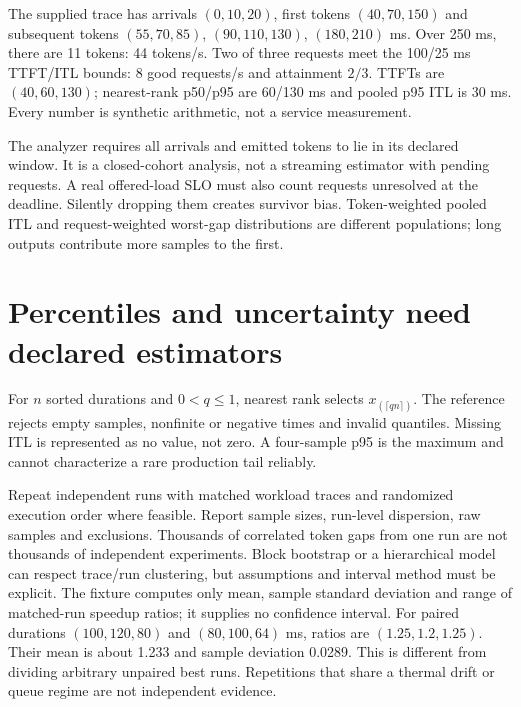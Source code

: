 The supplied trace has arrivals $(0,10,20)$, first tokens $(40,70,150)$ and
subsequent tokens $(55,70,85)$, $(90,110,130)$, $(180,210)$ ms. Over 250 ms,
there are 11 tokens: 44 tokens/s. Two of three requests meet the 100/25 ms
TTFT/ITL bounds: 8 good requests/s and attainment $2/3$. TTFTs are $(40,60,130)$;
nearest-rank p50/p95 are 60/130 ms and pooled p95 ITL is 30 ms. Every number
is synthetic arithmetic, not a service measurement.

The analyzer requires all arrivals and emitted tokens to lie in its declared
window. It is a closed-cohort analysis, not a streaming estimator with pending
requests. A real offered-load SLO must also count requests unresolved at the
deadline. Silently dropping them creates survivor bias. Token-weighted pooled
ITL and request-weighted worst-gap distributions are different populations;
long outputs contribute more samples to the first.

\section{Percentiles and uncertainty need declared estimators}
\label{evod47:uncertainty}
For $n$ sorted durations and $0<q\le1$, nearest rank selects
$x_{(\lceil qn\rceil)}$. The reference rejects empty samples, nonfinite or
negative times and invalid quantiles. Missing ITL is represented as no value,
not zero. A four-sample p95 is the maximum and cannot characterize a rare
production tail reliably.

Repeat independent runs with matched workload traces and randomized execution
order where feasible. Report sample sizes, run-level dispersion, raw samples
and exclusions. Thousands of correlated token gaps from one run are not
thousands of independent experiments. Block bootstrap or a hierarchical
model can respect trace/run clustering, but assumptions and interval method
must be explicit. The fixture computes only mean, sample standard deviation
and range of matched-run speedup ratios; it supplies no confidence interval.
For paired durations $(100,120,80)$ and $(80,100,64)$ ms, ratios are
$(1.25,1.2,1.25)$. Their mean is about 1.233 and sample deviation 0.0289.
This is different from dividing arbitrary unpaired best runs. Repetitions
that share a thermal drift or queue regime are not independent evidence.

